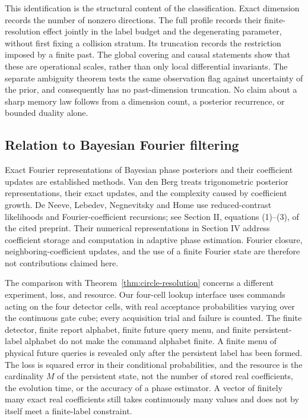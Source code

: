 \documentclass[11pt]{amsart}
\theoremstyle{definition}\newtheorem{definition}[theorem]{Definition}
\theoremstyle{remark}\newtheorem{remark}[theorem]{Remark}
\begin{document}
This identification is the structural content of the classification.
Exact dimension records the number of nonzero directions. The full
profile records their finite-resolution effect jointly in the label
budget and the degenerating parameter, without first fixing a collision
stratum. Its truncation records the restriction imposed by a finite
past. The global covering and causal statements show that these are
operational scales, rather than only local differential invariants.
The separate ambiguity theorem tests the same observation flag against
uncertainty of the prior, and consequently has no past-dimension
truncation. No claim about a sharp memory law follows from a dimension
count, a posterior recurrence, or bounded duality alone.

\subsection{Relation to Bayesian Fourier filtering}
\label{sec:fourier-filtering-comparison}
Exact Fourier representations of Bayesian phase posteriors and their
coefficient updates are established methods. Van den Berg
\cite[Section 2.2, equations (12)--(15)]{VanDenBerg2021} treats
trigonometric posterior representations, their exact updates, and the
complexity caused by coefficient growth. De Neeve, Lebedev, Negnevitsky
and Home \cite{DeNeeveEtAl2025} use reduced-contrast likelihoods and
Fourier-coefficient recursions; see Section II, equations (1)--(3), of
the cited preprint. Their numerical representations in Section IV
address coefficient storage and computation in adaptive phase
estimation. Fourier closure, neighboring-coefficient updates, and the
use of a finite Fourier state are therefore not contributions claimed
here.

The comparison with Theorem~\ref{thm:circle-resolution} concerns a
different experiment, loss, and resource. Our four-cell lookup interface
uses commands acting on the four detector cells, with real acceptance
probabilities varying over the continuous gate cube; every acquisition
trial and failure is counted. The finite detector, finite report alphabet,
finite future query menu, and finite persistent-label alphabet do not
make the command alphabet finite. A finite menu of physical future queries
is revealed only after the persistent label has been formed. The loss
is squared error in their conditional probabilities, and the resource
is the cardinality $M$ of the persistent state, not the number of
stored real coefficients, the evolution time, or the accuracy of a
phase estimator. A vector of finitely many exact real coefficients
still takes continuously many values and does not by itself meet a
finite-label constraint.
\end{document}
